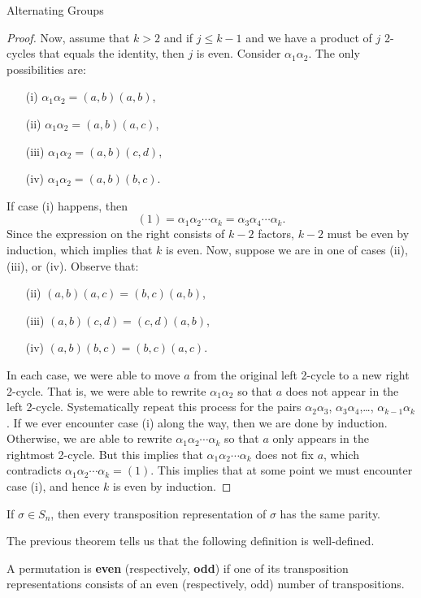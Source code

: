 \begin{section}{Alternating Groups}
\begin{proof}
Now, assume that $k>2$ and if $j\leq k-1$ and we have a product of $j$ 2-cycles that equals the identity, then $j$ is even. Consider $\alpha_1\alpha_2$. The only possibilities are:
\begin{enumerate}
\item[(i)] $\alpha_1\alpha_2=(a,b)(a,b)$,
\item[(ii)] $\alpha_1\alpha_2=(a,b)(a,c)$,
\item[(iii)] $\alpha_1\alpha_2=(a,b)(c,d)$,
\item[(iv)] $\alpha_1\alpha_2=(a,b)(b,c)$.
\end{enumerate}
If case (i) happens, then
\[
(1)=\alpha_1\alpha_2\cdots\alpha_k=\alpha_3\alpha_4\cdots\alpha_k.
\]
Since the expression on the right consists of $k-2$ factors, $k-2$ must be even by induction, which implies that $k$ is even. Now, suppose we are in one of cases (ii), (iii), or (iv). Observe that:
\begin{enumerate}
\item[(ii)] $(a,b)(a,c)=(b,c)(a,b)$,
\item[(iii)] $(a,b)(c,d)=(c,d)(a,b)$,
\item[(iv)] $(a,b)(b,c)=(b,c)(a,c)$.
\end{enumerate}
In each case, we were able to move $a$ from the original left 2-cycle to a new right 2-cycle. That is, we were able to rewrite $\alpha_1\alpha_2$ so that $a$ does not appear in the left 2-cycle. Systematically repeat this process for the pairs $\alpha_2\alpha_3$, $\alpha_3\alpha_4$,\ldots, $\alpha_{k-1}\alpha_k$. If we ever encounter case (i) along the way, then we are done by induction. Otherwise, we are able to rewrite $\alpha_1\alpha_2\cdots\alpha_k$ so that $a$ only appears in the rightmost 2-cycle. But this implies that $\alpha_1\alpha_2\cdots\alpha_k$ does not fix $a$, which contradicts $\alpha_1\alpha_2\cdots\alpha_k =(1)$. This implies that at some point we must encounter case (i), and hence $k$ is even by induction.
\end{proof}

\begin{theorem}
If $\sigma\in S_n$, then every transposition representation of $\sigma$ has the same parity.
\end{theorem}

The previous theorem tells us that the following definition is well-defined.

\begin{definition}
A permutation is \textbf{even} (respectively, \textbf{odd}) if one of its transposition representations consists of an even (respectively, odd) number of transpositions.
\end{definition}


\end{section}
